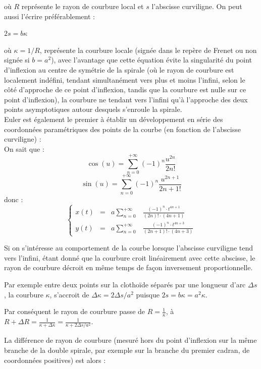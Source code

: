 \documentclass[a4paper,11pt]{book}
\begin{document}
o\`u $R$ repr\'esente le rayon de courbure local et $s$ l'abscisse curviligne. 
On peut aussi l'\'ecrire pr\'ef\'erablement :

   $ 2s=b\kappa$

o\`u $\kappa = 1/R$, repr\'esente la courbure locale (sign\'ee dans le rep\`ere
 de Frenet ou non sign\'ee si $b=a^2$), avec l'avantage que cette \'equation 
\'evite la singularit\'e du 
point d'inflexion au centre de sym\'etrie de la spirale (o\`u le rayon de 
courbure est localement ind\'efini, tendant simultan\'ement vers plus et moins 
l'infini, selon le c\^ot\'e d'approche de ce point d'inflexion, tandis que la 
courbure est nulle sur ce point d'inflexion), la courbure ne tendant vers 
l'infini qu'\`a l'approche des deux points asymptotiques autour desquels 
s'enroule la spirale.\\
Euler est \'egalement le premier \`a \'etablir un d\'eveloppement en s\'erie 
des coordonn\'ees param\'etriques des points de la courbe (en fonction de 
l'abscisse curviligne) :\\
On sait que :\\
$$\cos(u)=\sum_{n=0}^{+\infty}(-1)^n\frac{u^{2n}}{2n!}$$
$$\sin(u)=\sum_{n=0}^{+\infty}(-1)^n\frac{u^{2n+1}}{2n+1!}$$
donc :
 $$\left\{\begin{matrix} x(t) & =&a\sum_{n=0}^{+\infty} & \displaystyle \frac{(-1)^n \cdot t^{4n+1}}{(2n)! \cdot (4n+1)} \\ y(t) & = & a\sum_{n=0}^{+\infty} &\displaystyle  \frac{(-1)^n \cdot t^{4n+3}}{(2n+1)! \cdot (4n+3)} \end{matrix}\right.$$

Si on s'int\'eresse au comportement de la courbe lorsque l'abscisse curviligne 
tend vers l'infini, \'etant donn\'e que la courbure croit lin\'eairement avec 
cette abscisse, le rayon de courbure d\'ecroit en m\^eme temps de fa\c{c}on 
inversement proportionnelle.

Par exemple entre deux points sur la clotho\"{i}de s\'epar\'es par une longueur
d'arc $\Delta s$, la courbure $\kappa$, s'accroit de 
$\Delta \kappa = 2 \Delta s / a^2$ puisque $ 2s=b\kappa=a^2\kappa$.

Par cons\'equent le rayon de courbure passe de $R = \displaystyle\frac{1}{\kappa}$, \`a 
$R+\Delta R = \displaystyle\frac{1}{\kappa + \Delta \kappa} = \frac{1}{\kappa + 2 \Delta s / a^2}$.

La diff\'erence de rayon de courbure (mesur\'e hors du point d'inflexion sur la
 m\^eme branche de la double spirale, par exemple sur la branche du premier 
cadran, de coordonn\'ees positives) est alors :
\end{document}
